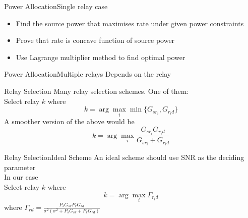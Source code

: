 \documentclass{beamer}
\begin{document}
\begin{frame}{Power Allocation}{Single relay case}
	\vspace{1cm}
	\begin{itemize}  
  \item
	  Find the source power that maximises rate under given power constraints
  \vspace{1cm}
  \pause
  \item Prove that rate is concave function of source power
  \pause
  \vspace{1cm}
  \item Use Lagrange multiplier method to find optimal power 	

	\end{itemize}
\end{frame}

\begin{frame}{Power Allocation}{Multiple relays}
	\vspace{-1cm}
	Depends on the relay
\end{frame}

\begin{frame}{Relay Selection}
	\vspace{-1cm}
Many relay selection schemes. One of them: \\ 
	\vspace{1cm}
	Select relay $k$
where 
	\begin{equation*}
		k = \arg \max\limits_{i} \min\{ G_{sr_i},G_{r_id} \} 
	\end{equation*}
	\pause
	A smoother version of the above would be
	\begin{equation*}
		k = \arg \max\limits_{i} \frac{ G_{sr_i}G_{r_id} }{ G_{sr_i}+G_{r_id} } 
	\end{equation*}
	
\end{frame}

\begin{frame}{Relay Selection}{Ideal Scheme}
	\vspace{-1cm}
	An ideal scheme should use SNR as the deciding parameter \\
	In our case \\
Select relay $k$
where 
	\begin{equation*}
		k = \arg \max\limits_{i} \Gamma_{r_id}
	\end{equation*}
	where $\Gamma_{rd} = \frac {P_s G_{sr} P_r G_{rd}}{\sigma^2(\sigma^2 + P_sG_{sr} + P_rG_{rd})}$	
\end{frame}
\end{document}
